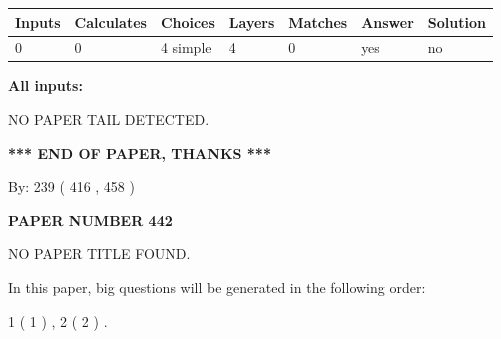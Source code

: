 \documentclass[12pt]{article}
\begin{document}
 
   
   
   
   
\noindent\begin{tabular}{|l|l|l|l|l|l|l|}
 \hline
Inputs & Calculates & Choices & Layers & Matches & Answer & Solution \\ \hline
 0  & 
 0  & 
 4
  simple  
  & 
 4  & 
 0  & 
  yes & 
  no 
  \\ \hline
 \end{tabular}
   
   
   
   
\noindent{}
   
   
   
   
\noindent\vspace{0.1in}\hspace{-0.08in} {\textbf{\Large{All inputs: }}}
   
   
   
   
\vspace{2.0in} NO PAPER TAIL DETECTED.
   
   
   
   
\vspace{1.0in} 
{\textbf{\large{ *** END OF PAPER, THANKS *** }}} 
   
   
\hspace{1.0in} By: 
 239 ( 416 ,  458 )
   
   
   
   
\newpage 
\setcounter{page}{ 
   442001 } 
   
   
   
   
 {\textbf{ \Large{ PAPER NUMBER  442  }}}
   
   
\vspace{0.2in}
   
   
   
   
   
   
 NO PAPER TITLE FOUND.
   
   
   
\vspace{0.2in}
   
In this paper, big questions will be generated in the following order: 
   
   
   1 ( 1 )
 ,
   2 ( 2 )
 .
  
\vspace{0.2in}
  
\end{document}
